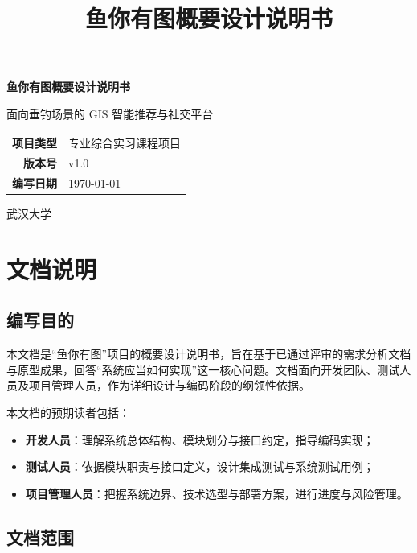 \documentclass[12pt,a4paper]{ctexart}
\title{\Huge\bfseries 鱼你有图概要设计说明书}
\author{}
\date{}
\begin{document}
\begin{titlepage}
  \centering
  \vspace*{3cm}

  {\Huge\bfseries 鱼你有图概要设计说明书\par}
  \vspace{0.8cm}
  {\LARGE 面向垂钓场景的 GIS 智能推荐与社交平台\par}

  \vspace{2.5cm}

  \begin{tabular}{rl}
    \textbf{项目类型} & 专业综合实习课程项目 \\[6pt]
    \textbf{版本号}   & v1.0 \\[6pt]
    \textbf{编写日期} & \today \\
  \end{tabular}

  \vspace{2cm}
  {\large 武汉大学}
\end{titlepage}

\tableofcontents
\newpage

\section{文档说明}

\subsection{编写目的}

本文档是“鱼你有图”项目的概要设计说明书，旨在基于已通过评审的需求分析文档与原型成果，回答“系统应当如何实现”这一核心问题。文档面向开发团队、测试人员及项目管理人员，作为详细设计与编码阶段的纲领性依据。

本文档的预期读者包括：
\begin{itemize}
  \item \textbf{开发人员}：理解系统总体结构、模块划分与接口约定，指导编码实现；
  \item \textbf{测试人员}：依据模块职责与接口定义，设计集成测试与系统测试用例；
  \item \textbf{项目管理人员}：把握系统边界、技术选型与部署方案，进行进度与风险管理。
\end{itemize}

\subsection{文档范围}
\end{document}
